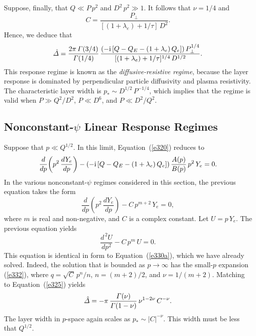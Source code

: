 \documentclass[notitlepage,12pt]{article}
\begin{document}
Suppose, finally, that $Q\ll P\,p^2$ and $D^2\,p^2\gg 1$. It follows that $\nu=1/4$ and
\begin{equation}
C = \frac{P_\perp}{[(1+\lambda_e)+1/\tau]\,D^2}.
\end{equation}
Hence, we deduce that 
\begin{equation}\label{hr}
\hat{\mit\Delta}= \frac{2\pi\,{\mit\Gamma}(3/4)}{{\mit\Gamma}(1/4)}\,\frac{(-{\rm i}\,[Q-Q_E-(1+\lambda_e)\,Q_e])\,P_\perp^{1/4}}{[(1+\lambda_e)+1/\tau]^{1/4}\,D^{1/2}}.
\end{equation}
This response regime is known as the {\em diffusive-resistive regime}, because the layer 
response is dominated by perpendicular particle diffusivity and plasma resistivity. The characteristic
layer width is $p_\ast \sim D^{1/2}\,P^{-1/4}$, which implies that the regime is valid when $P\gg Q^2/D^2$,
$P\ll D^6$, and $P\ll D^2/Q^2$. 

\subsection{Nonconstant-$\psi$ Linear Response Regimes}\label{sncp}
Suppose that $p\ll Q^{1/2}$. In this limit, Equation~(\ref{e320}) reduces to 
\begin{equation}
\frac{d}{dp}\!\left(p^2\,\frac{dY_e}{dp}\right)-(-{\rm i}\,[Q-Q_E-(1+\lambda_e)\,Q_e])\,\frac{A(p)}{B(p)}\,p^2\,Y_e=0.
\end{equation}
In the various nonconstant-$\psi$ regimes considered in this section, the previous equation takes the form
\begin{equation}
\frac{d}{dp}\!\left(p^2\,\frac{dY_e}{dp}\right)-C\,p^{m+2}\,Y_e = 0,
\end{equation}
where $m$ is real and non-negative, and $C$ is a complex constant. Let $U=p\,Y_e$. The previous equation
yields
\begin{equation}
\frac{d^{\,2} U}{dp^2} - C\,p^m\,U = 0.
\end{equation}
This equation is identical in form to Equation~(\ref{e330a}), which we have already solved. Indeed, the solution that
is bounded as $p\rightarrow\infty$ has the small-$p$ expansion (\ref{e332}), where $q=\sqrt{C}\,p^n/n$, 
$n=(m+2)/2$, and $\nu=1/(m+2)$. Matching to Equation~(\ref{e325}) yields
\begin{equation}
\hat{\mit\Delta} = -\pi\,\frac{{\mit\Gamma}(\nu)}{{\mit\Gamma}(1-\nu)}\,\nu^{1-2\nu}\,C^{-\nu}.
\end{equation}
The layer width in $p$-space again scales as $p_\ast\sim |C|^{-\nu}$. This width must be
less that $Q^{1/2}$. 
\end{document}
